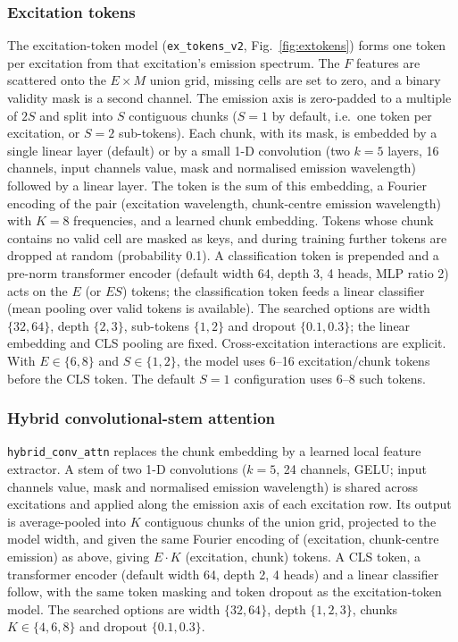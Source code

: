 \documentclass[journal]{IEEEtran}
\begin{document}
\subsubsection{Excitation tokens}\label{sec:extok}
The excitation-token model (\texttt{ex\_tokens\_v2}, Fig.~\ref{fig:extokens}) forms one token per excitation from that excitation's emission spectrum. The $F$ features are scattered onto the $E\times M$ union grid, missing cells are set to zero, and a binary validity mask is a second channel. The emission axis is zero-padded to a multiple of $2S$ and split into $S$ contiguous chunks ($S=1$ by default, i.e.\ one token per excitation, or $S=2$ sub-tokens). Each chunk, with its mask, is embedded by a single linear layer (default) or by a small 1-D convolution (two $k{=}5$ layers, 16 channels, input channels value, mask and normalised emission wavelength) followed by a linear layer. The token is the sum of this embedding, a Fourier encoding of the pair (excitation wavelength, chunk-centre emission wavelength) with $K{=}8$ frequencies, and a learned chunk embedding. Tokens whose chunk contains no valid cell are masked as keys, and during training further tokens are dropped at random (probability 0.1). A classification token is prepended and a pre-norm transformer encoder (default width 64, depth 3, 4 heads, MLP ratio 2) acts on the $E$ (or $ES$) tokens; the classification token feeds a linear classifier (mean pooling over valid tokens is available). The searched options are width $\{32,64\}$, depth $\{2,3\}$, sub-tokens $\{1,2\}$ and dropout $\{0.1,0.3\}$; the linear embedding and CLS pooling are fixed. Cross-excitation interactions are explicit. With $E\in\{6,8\}$ and $S\in\{1,2\}$, the model uses 6--16 excitation/chunk tokens before the CLS token. The default $S=1$ configuration uses 6--8 such tokens.

\subsubsection{Hybrid convolutional-stem attention}
\texttt{hybrid\_conv\_attn} replaces the chunk embedding by a learned local feature extractor. A stem of two 1-D convolutions ($k{=}5$, 24 channels, GELU; input channels value, mask and normalised emission wavelength) is shared across excitations and applied along the emission axis of each excitation row. Its output is average-pooled into $K$ contiguous chunks of the union grid, projected to the model width, and given the same Fourier encoding of (excitation, chunk-centre emission) as above, giving $E\cdot K$ (excitation, chunk) tokens. A CLS token, a transformer encoder (default width 64, depth 2, 4 heads) and a linear classifier follow, with the same token masking and token dropout as the excitation-token model. The searched options are width $\{32,64\}$, depth $\{1,2,3\}$, chunks $K\in\{4,6,8\}$ and dropout $\{0.1,0.3\}$.
\end{document}
